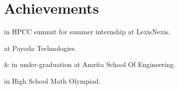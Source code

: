 \documentclass[]{bigfatnoob-resume}
\begin{document}
\section{Achievements}
\vspace{\topsep}
\begin{tightemize}
    \item {} in HPCC summit for summer internship at LexisNexis.
    \item {} at Payoda Technologies.
    \item {} \&  in under-graduation at Amrita School Of Engineering.
    \item {} in High School Math Olympiad.
\end{tightemize}
\end{document}
